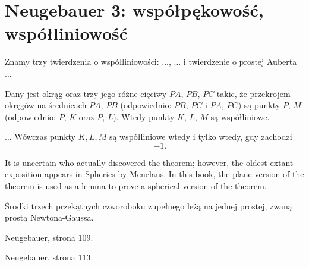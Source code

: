 \documentclass{parchment}
\begin{document}




\chapter{Neugebauer 3: współpękowość, współliniowość}

Znamy trzy twierdzenia o współliniowości: ..., ... i twierdzenie o prostej Auberta ...

\begin{proposition}
	Dany jest okrąg oraz trzy jego różne cięciwy $PA$, $PB$, $PC$ takie, że przekrojem okręgów na średnicach $PA$, $PB$ (odpowiednio: $PB$, $PC$ i $PA$, $PC$) są punkty $P$, $M$ (odpowiednio: $P$, $K$ oraz $P$, $L$).
	Wtedy punkty $K$, $L$, $M$ są współliniowe.
\end{proposition}

\begin{proposition}
	...
	Wówczas punkty $K, L, M$ są współliniowe wtedy i tylko wtedy, gdy zachodzi
	\begin{equation}
		[AMB] [BKC] [CLA] = -1.
	\end{equation}
\end{proposition}
It is uncertain who actually discovered the theorem; however, the oldest extant exposition appears in Spherics by Menelaus. In this book, the plane version of the theorem is used as a lemma to prove a spherical version of the theorem.



\begin{proposition}
	Środki trzech przekątnych czworoboku zupełnego leżą na jednej prostej, zwaną prostą Newtona-Gaussa.
\end{proposition}

\begin{proposition}
	Neugebauer, strona 109.
\end{proposition}

\begin{proposition}
	Neugebauer, strona 113.
\end{proposition}
\end{document}
